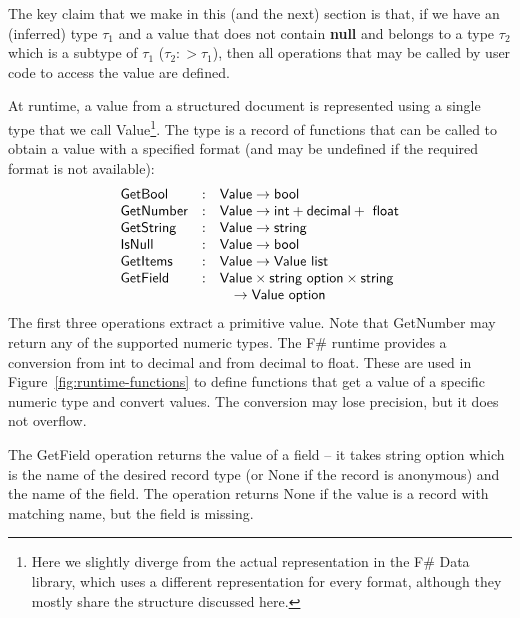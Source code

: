 \documentclass[10pt]{sigplanconf}
\newcommand{\kvd}[1]{\textbf{\sffamily #1}}
\newcommand{\ident}[1]{\textnormal{\sffamily #1}}
\begin{document}
The key claim that we make in this (and the next) section is that, if we have an (inferred) type $\tau_1$ and
a value that does not contain \kvd{null} and belongs to a type $\tau_2$ which is a subtype 
of $\tau_1$ ($\tau_2 :> \tau_1$), then all operations that may be called by user code to 
access the value are defined.

At runtime, a value from a structured document is represented using a single type that
we call \ident{Value}\footnote{Here we slightly diverge from the actual representation in 
the F\# Data library, which uses a different representation for every format, although they 
mostly share the structure discussed here.}. The type is a record of functions that can be 
called to obtain a value with a specified format (and may be undefined if the required format
is not available):
%
\begin{equation*}
\begin{array}{lcl}
\ident{GetBool} &:& \ident{Value} \rightarrow \ident{bool} \\
\ident{GetNumber} &:& \ident{Value} \rightarrow \ident{int}+\ident{decimal}+\ident{float} \\
\ident{GetString} &:& \ident{Value} \rightarrow \ident{string} \\
\ident{IsNull} &:& \ident{Value} \rightarrow \ident{bool}\\
\ident{GetItems} &:& \ident{Value} \rightarrow \ident{Value list}\;\\
\ident{GetField} &:& \ident{Value} \times \ident{string option} \times \ident{string} \\
                  && \quad \rightarrow \ident{Value option}
\end{array}
\end{equation*}
%
The first three operations extract a primitive value. Note that \ident{GetNumber} may return
any of the supported numeric types. The F\# runtime provides a conversion from \ident{int}
to \ident{decimal} and from \ident{decimal} to \ident{float}. These are used in Figure~\ref{fig:runtime-functions}
to define functions that get a value of a specific numeric type and convert values. The conversion
may lose precision, but it does not overflow.

The \ident{GetField} operation returns the value of a field -- it takes \ident{string option} 
which is the name of the desired record type (or \ident{None} if the record is anonymous) and
the name of the field. The operation returns \ident{None} if the value is a record with matching
name, but the field is missing. 
\end{document}
